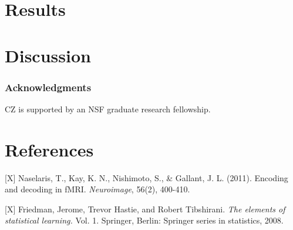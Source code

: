 \documentclass{article}
\begin{document}
\section{Results}

\section{Discussion}


\subsubsection*{Acknowledgments}

CZ is supported by an NSF graduate research fellowship.

\section*{References}

\small

[X] Naselaris, T., Kay, K. N., Nishimoto, S., \& Gallant,
J. L. (2011). Encoding and decoding in fMRI. \emph{Neuroimage}, 56(2),
400-410.

[X] Friedman, Jerome, Trevor Hastie, and Robert Tibshirani. \emph{The elements
of statistical learning.} Vol. 1. Springer, Berlin: Springer series in
statistics, 2008.
\end{document}
